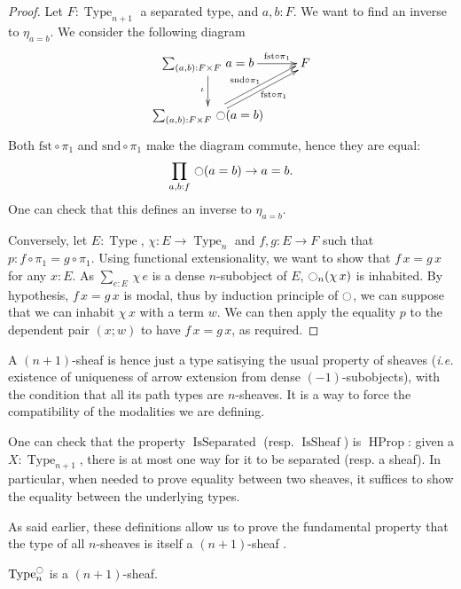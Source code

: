 \documentclass[notfinal]{jfrarticle}
\makeatletter
\def\dar[#1]#2{\ar@<-#2>[#1]\ar@<#2>[#1]} %
\DeclareMathOperator{\Type}{Type}
\DeclareMathOperator{\HProp}{HProp}
\newcommand{\modal}{\ensuremath{\ocircle}}
\newcommand{\sumD}[3]{\sum_{#1:#2}\, #3}
\newcommand{\prodD}[3]{\prod_{#1:#2}\, #3}
\newcommand{\code}[1]{\texttt{#1}}
\DeclareMathOperator{\issep}{IsSeparated}
\DeclareMathOperator{\issheaf}{IsSheaf}
\newcommand{\ie}{\emph{i.e.}}
\makeatother
\begin{document}
\begin{proof}
  Let $F:\Type_{n+1}$ a separated type, and $a,b:F$. We want to find
  an inverse to $\eta_{a=b}$. We consider the following diagram 
   \[ \xymatrix{
    \sumD {(a,b)} {F\times F} {a=b} \ar[r]^-{\text{fst} \circ \pi_1} \ar[d]_{\iota} & F \\
    \sumD {(a,b)} {F\times F} {\modal(a=b)}
    \dar[ru]{2pt}_{\quad\text{fst}\circ \pi_1} ^{\text{snd} \circ \pi_1} &
  }\]
  Both $\text{fst} \circ \pi_1$ and $\text{snd}\circ\pi_1$ make the
  diagram commute, hence they are equal:
  \[\prodD {a,b} f {\modal (a=b) \to a = b}.\]
  One can check that this defines an inverse to $\eta_{a=b}$.


  Conversely, let $E:\Type$, $\chi: E \to\Type_n$ and $f,g: E\to
  F$ such that $p:f\circ\pi_1 = g\circ \pi_1$.
  Using functional extensionality, we want to show that $f\, x=g\,x $
  for any $x:E$. As $\sumD e E {\chi\, e}$ is a dense $n$-subobject of $E$,
  $\modal_n (\chi\, x)$ is inhabited. By hypothesis, $f\, x = g\, x$
  is modal, thus by induction principle of $\modal$, we can suppose
  that we can inhabit $\chi\, x$ with a term $w$. We can then apply
  the equality $p$ to the dependent pair $(x;w)$ to have $f\, x =
  g\, x$, as required. 
\end{proof}

A $(n+1)$-sheaf is hence just a type satisying the usual property of sheaves
(\ie{} existence of uniqueness of arrow extension from dense
$(-1)$-subobjects), with the condition that all its path types are
$n$-sheaves. It is a way to force the compatibility of the modalities we
are defining.

One can check that the property $\issep$ (resp. $\issheaf$) is $\HProp$:
given a $X:\Type_{n+1}$, there is at most one way for it to be separated
(resp. a sheaf). In particular, when needed to prove equality between
two sheaves, it suffices to show the equality between the underlying
types.

As said earlier, these definitions allow us to prove the fundamental
property that the type of all $n$-sheaves is itself a $(n+1)$-sheaf
.

\begin{prop}[\thethm\ (\code{nType\_j\_Type\_is\_SnType\_j\_Type})]
\label{prop:sheaf-is-sheaf}
  $\Type_n^\modal$ is a $(n+1)$-sheaf.
\end{prop}
\end{document}
